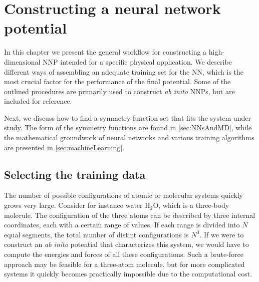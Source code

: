 \documentclass[twoside,english]{uiofysmaster}
\begin{document}
\chapter{Constructing a neural network potential} \label{sec:constructingNNP}
In this chapter we present the general workflow for constructing a high-dimensional NNP 
intended for a specific physical application. We describe different ways of assembling 
an adequate training set for the NN, which is the most crucial factor for the performance of 
the final potential. Some of the outlined procedures are primarily used to construct 
\textit{ab inito} NNPs, but are included for reference. 

Next, we discuss how to find a symmetry function set that fits the system under study.
The form of the symmetry functions are found in \autoref{sec:NNsAndMD}, while
the mathematical groundwork of neural networks and various training algorithms are presented in \autoref{sec:machineLearning}.



\section{Selecting the training data} \label{sec:selectingTrainingData}
The number of possible configurations of atomic or molecular systems quickly grows very large. 
Consider for instance water $\textrm{H}_2\textrm{O}$, which is a three-body molecule. The configuration of the
three atoms can be described by three internal coordinates, each with a certain range of values. 
If each range is divided into $N$ equal segments, the total number of distint configurations is $N^3$. 
If we were to construct an \textit{ab inito} potential that characterizes this system, we would have to compute the energies 
and forces of all these configurations. 
Such a brute-force approach may be feasible for a three-atom molecule, but for more complicated systems
it quickly becomes practically impossible due to the computational cost. 
\end{document}

